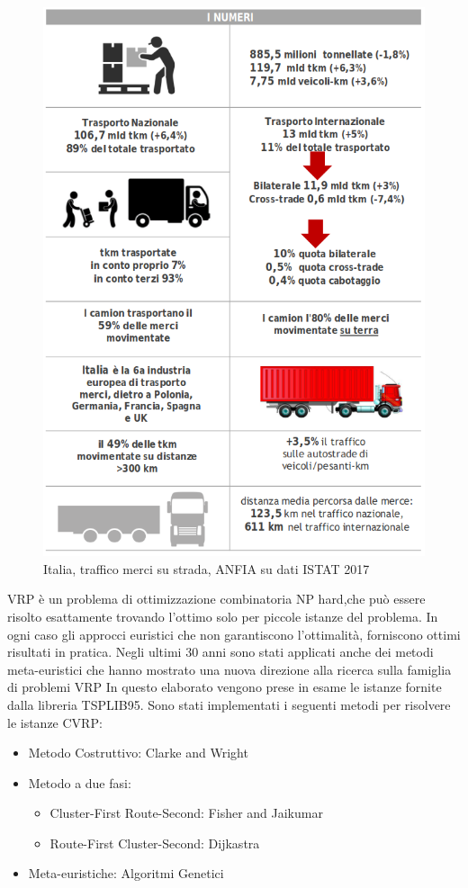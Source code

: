 \documentclass[]{article}
\begin{document}
\begin{figure}[h!]
	\centering
	\includegraphics[scale=0.50]{images/ITA28.png}
	\caption{ Italia, traffico merci su strada, ANFIA su dati ISTAT 2017 }
	\label{fig:ITA28}
\end{figure}

VRP è un problema di ottimizzazione combinatoria NP hard,che può essere risolto esattamente trovando l'ottimo solo per piccole istanze del problema. In ogni caso gli approcci euristici che non garantiscono l'ottimalità, forniscono ottimi risultati in pratica.
Negli ultimi 30 anni sono stati applicati anche dei metodi meta-euristici che hanno mostrato una nuova direzione alla ricerca sulla famiglia di problemi VRP  
In questo elaborato vengono prese in esame le istanze fornite dalla libreria TSPLIB95\cite{TSPLIB95}.
Sono stati implementati i seguenti metodi per risolvere le istanze CVRP:
\begin{itemize}
	\item Metodo Costruttivo: Clarke and Wright
	\item Metodo a due fasi:
	\begin{itemize}
		\item Cluster-First Route-Second: Fisher and Jaikumar
		\item Route-First Cluster-Second: Dijkastra
	\end{itemize}
	\item Meta-euristiche: Algoritmi Genetici
\end{itemize}
\end{document}
